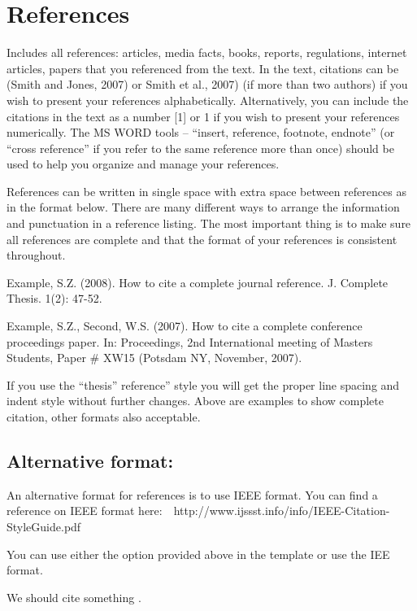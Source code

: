 \section*{References} \label{sectionReferences}

Includes all references: articles, media facts, books, reports, regulations, internet articles, papers that you referenced from the text.  In the text, citations can be (Smith and Jones, 2007) or Smith et al., 2007) (if more than two authors) if you wish to present your references alphabetically.  Alternatively, you can include the citations in the text as a number [1] or 1 if you wish to present your references numerically.  The MS WORD tools – “insert, reference, footnote, endnote” (or “cross reference” if you refer to the same reference more than once) should be used to help you organize and manage your references.

References can be written in single space with extra space between references as in the format below.  There are many different ways to arrange the information and punctuation in a reference listing.  The most important thing is to make sure all references are complete and that the format of your references is consistent throughout. 

Example, S.Z. (2008). How to cite a complete journal reference. J. Complete Thesis. 1(2): 47-52.

Example, S.Z., Second, W.S. (2007). How to cite a complete conference proceedings paper. In: Proceedings, 2nd International meeting of Masters Students, Paper \# XW15 (Potsdam NY, November, 2007).

If you use the “thesis” reference” style you will get the proper line spacing and indent style without further changes. Above are examples to show complete citation, other formats also acceptable.

\subsection*{Alternative format:}
An alternative format for references is to use IEEE format. You can find a reference on IEEE format here:  http://www.ijssst.info/info/IEEE-Citation-StyleGuide.pdf

You can use either the option provided above in the template or use the IEE format. 

We should cite something \cite{sample:docs}.


\newpage



